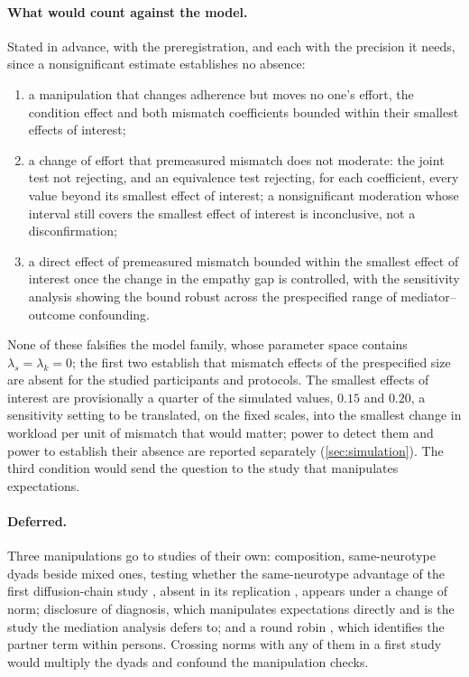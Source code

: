 \paragraph{What would count against the model.} Stated in advance, with the preregistration, and each with the precision it needs, since a nonsignificant estimate establishes no absence:
\begin{enumerate}[label=(\roman*), leftmargin=*, nosep]
\item a manipulation that changes adherence but moves no one's effort, the condition effect and both mismatch coefficients bounded within their smallest effects of interest;
\item a change of effort that premeasured mismatch does not moderate: the joint test not rejecting, and an equivalence test \cite{Lakens2017, Lakens2018} rejecting, for each coefficient, every value beyond its smallest effect of interest; a nonsignificant moderation whose interval still covers the smallest effect of interest is inconclusive, not a disconfirmation;
\item a direct effect of premeasured mismatch bounded within the smallest effect of interest once the change in the empathy gap is controlled, with the sensitivity analysis showing the bound robust across the prespecified range of mediator--outcome confounding.
\end{enumerate}
None of these falsifies the model family, whose parameter space contains $\lambda_s = \lambda_k = 0$; the first two establish that mismatch effects of the prespecified size are absent for the studied participants and protocols. The smallest effects of interest are provisionally a quarter of the simulated values, $0.15$ and $0.20$, a sensitivity setting to be translated, on the fixed scales, into the smallest change in workload per unit of mismatch that would matter; power to detect them and power to establish their absence are reported separately (\autoref{sec:simulation}). The third condition would send the question to the study that manipulates expectations.

\paragraph{Deferred.} Three manipulations go to studies of their own: composition, same-neurotype dyads beside mixed ones, testing whether the same-neurotype advantage of the first diffusion-chain study \cite{Crompton2020}, absent in its replication \cite{Crompton2025}, appears under a change of norm; disclosure of diagnosis, which manipulates expectations directly and is the study the mediation analysis defers to; and a round robin \cite{KennyLaVoie1984}, which identifies the partner term within persons. Crossing norms with any of them in a first study would multiply the dyads and confound the manipulation checks.

